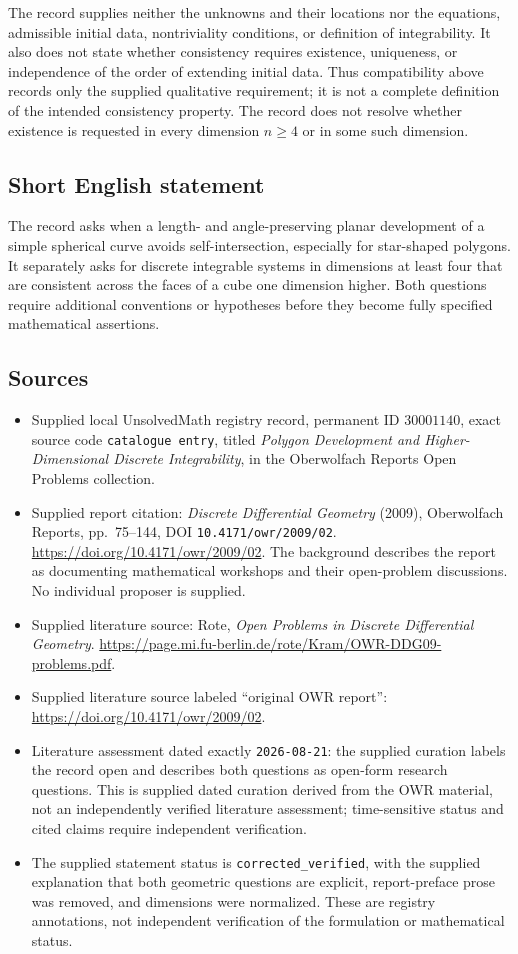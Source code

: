 \documentclass[11pt]{article}
\begin{document}
The record supplies neither the unknowns and their locations nor the equations, admissible initial data, nontriviality conditions, or definition of integrability. It also does not state whether consistency requires existence, uniqueness, or independence of the order of extending initial data. Thus compatibility above records only the supplied qualitative requirement; it is not a complete definition of the intended consistency property. The record does not resolve whether existence is requested in every dimension \(n\geq4\) or in some such dimension.
\subsection{Short English statement}
The record asks when a length- and angle-preserving planar development of a simple spherical curve avoids self-intersection, especially for star-shaped polygons. It separately asks for discrete integrable systems in dimensions at least four that are consistent across the faces of a cube one dimension higher. Both questions require additional conventions or hypotheses before they become fully specified mathematical assertions.
\subsection{Sources}
\begin{itemize}
\item Supplied local UnsolvedMath registry record, permanent ID \(30001140\), exact source code \texttt{catalogue entry}, titled \emph{Polygon Development and Higher-Dimensional Discrete Integrability}, in the Oberwolfach Reports Open Problems collection.
\item Supplied report citation: \emph{Discrete Differential Geometry} (2009), Oberwolfach Reports, pp.\ 75--144, DOI \texttt{10.4171/owr/2009/02}. \url{https://doi.org/10.4171/owr/2009/02}. The background describes the report as documenting mathematical workshops and their open-problem discussions. No individual proposer is supplied.
\item Supplied literature source: Rote, \emph{Open Problems in Discrete Differential Geometry}. \url{https://page.mi.fu-berlin.de/rote/Kram/OWR-DDG09-problems.pdf}.
\item Supplied literature source labeled ``original OWR report'': \url{https://doi.org/10.4171/owr/2009/02}.
\item Literature assessment dated exactly \texttt{2026-08-21}: the supplied curation labels the record open and describes both questions as open-form research questions. This is supplied dated curation derived from the OWR material, not an independently verified literature assessment; time-sensitive status and cited claims require independent verification.
\item The supplied statement status is \texttt{corrected\_verified}, with the supplied explanation that both geometric questions are explicit, report-preface prose was removed, and dimensions were normalized. These are registry annotations, not independent verification of the formulation or mathematical status.
\end{itemize}
\end{document}
